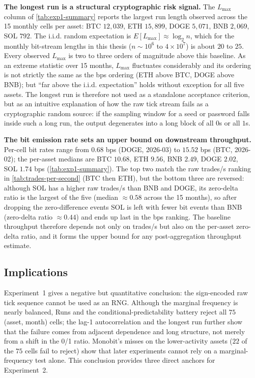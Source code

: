 \documentclass[11pt,titlepage,openany,oneside]{book}  %
\begin{document}
\textbf{The longest run is a structural cryptographic risk signal.} The $L_{\max}$ column of \cref{tab:exp1-summary} reports the largest run length observed across the 15 monthly cells per asset: BTC $12{,}039$, ETH $15{,}899$, DOGE $5{,}071$, BNB $2{,}069$, SOL $792$. The i.i.d. random expectation is $E[L_{\max}] \approx \log_2 n$, which for the monthly bit-stream lengths in this thesis ($n \sim 10^6$ to $4 \times 10^7$) is about $20$ to $25$. Every observed $L_{\max}$ is two to three orders of magnitude above this baseline. As an extreme statistic over 15 months, $L_{\max}$ fluctuates considerably and its ordering is not strictly the same as the bps ordering (ETH above BTC, DOGE above BNB); but ``far above the i.i.d. expectation'' holds without exception for all five assets. The longest run is therefore not used as a standalone acceptance criterion, but as an intuitive explanation of how the raw tick stream fails as a cryptographic random source: if the sampling window for a seed or password falls inside such a long run, the output degenerates into a long block of all $0$s or all $1$s.

\textbf{The bit emission rate sets an upper bound on downstream throughput.} Per-cell bit rates range from $0.68$ bps (DOGE, 2026-03) to $15.52$ bps (BTC, 2026-02); the per-asset medians are BTC $10.68$, ETH $9.56$, BNB $2.49$, DOGE $2.02$, SOL $1.74$ bps (\cref{tab:exp1-summary}). The top two match the raw trades/s ranking in \cref{tab:trades-per-second} (BTC then ETH), but the bottom three are reversed: although SOL has a higher raw trades/s than BNB and DOGE, its zero-delta ratio is the largest of the five (median $\approx 0.58$ across the 15 months), so after dropping the zero-difference events SOL is left with fewer bit events than BNB (zero-delta ratio $\approx 0.44$) and ends up last in the bps ranking. The baseline throughput therefore depends not only on trades/s but also on the per-asset zero-delta ratio, and it forms the upper bound for any post-aggregation throughput estimate.

\FloatBarrier %

\subsection{Implications}
\label{sec:exp1-implications}

Experiment~1 gives a negative but quantitative conclusion: the sign-encoded raw tick sequence cannot be used as an RNG. Although the marginal frequency is nearly balanced, Runs and the conditional-predictability battery reject all $75$ (asset, month) cells; the lag-1 autocorrelation and the longest run further show that the failure comes from adjacent dependence and long structure, not merely from a shift in the 0/1 ratio. Monobit's misses on the lower-activity assets ($22$ of the $75$ cells fail to reject) show that later experiments cannot rely on a marginal-frequency test alone. This conclusion provides three direct anchors for Experiment~2.
\end{document}
